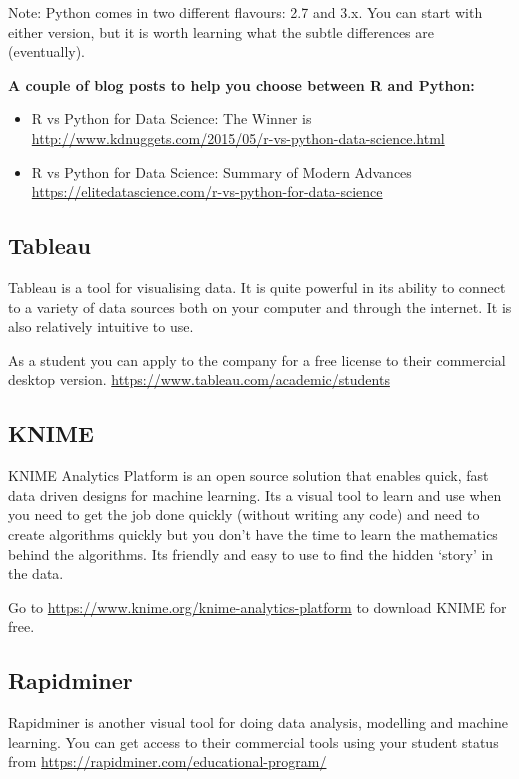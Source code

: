 \documentclass[]{book}
\providecommand{\tightlist}{%
  \setlength{\itemsep}{0pt}\setlength{\parskip}{0pt}}
\theoremstyle{definition}
\theoremstyle{definition}
\theoremstyle{remark}
\begin{document}
Note: Python comes in two different flavours: 2.7 and 3.x. You can start
with either version, but it is worth learning what the subtle
differences are (eventually).

\textbf{A couple of blog posts to help you choose between R and Python:}

\begin{itemize}
\tightlist
\item
  R vs Python for Data Science: The Winner is
  \url{http://www.kdnuggets.com/2015/05/r-vs-python-data-science.html}
\item
  R vs Python for Data Science: Summary of Modern Advances
  \url{https://elitedatascience.com/r-vs-python-for-data-science}
\end{itemize}

\subsection{Tableau}\label{tableau}

Tableau is a tool for visualising data. It is quite powerful in its
ability to connect to a variety of data sources both on your computer
and through the internet. It is also relatively intuitive to use.

As a student you can apply to the company for a free license to their
commercial desktop version.
\url{https://www.tableau.com/academic/students}

\subsection{KNIME}\label{knime}

KNIME Analytics Platform is an open source solution that enables quick,
fast data driven designs for machine learning. Its a visual tool to
learn and use when you need to get the job done quickly (without writing
any code) and need to create algorithms quickly but you don't have the
time to learn the mathematics behind the algorithms. Its friendly and
easy to use to find the hidden `story' in the data.

Go to \url{https://www.knime.org/knime-analytics-platform} to download
KNIME for free.

\subsection{Rapidminer}\label{rapidminer}

Rapidminer is another visual tool for doing data analysis, modelling and
machine learning. You can get access to their commercial tools using
your student status from
\url{https://rapidminer.com/educational-program/}
\end{document}
